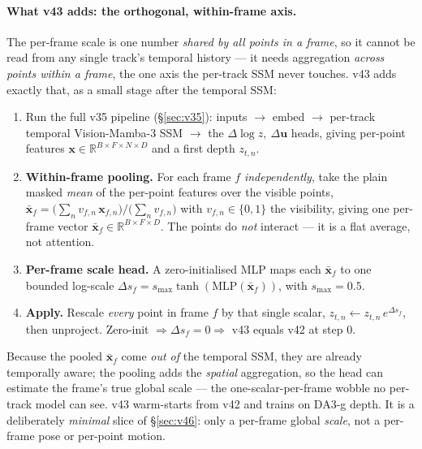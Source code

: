 \documentclass[11pt,a4paper]{article}
\begin{document}
\paragraph{What v43 adds: the orthogonal, within-frame axis.}
The per-frame scale is one number \emph{shared by all points in a frame}, so it cannot be read from any single
track's temporal history --- it needs aggregation \emph{across points within a frame}, the one axis the
per-track SSM never touches. v43 adds exactly that, as a small stage after the temporal SSM:
\begin{enumerate}
  \item Run the full v35 pipeline (\S\ref{sec:v35}): inputs $\to$ embed $\to$ per-track temporal Vision-Mamba-3 SSM
  $\to$ the $\Delta\log z,\ \Delta\mathbf{u}$ heads, giving per-point features
  $\mathbf{x}\in\mathbb{R}^{B\times F\times N\times D}$ and a first depth $z_{t,n}$.
  \item \textbf{Within-frame pooling.} For each frame $f$ \emph{independently}, take the plain masked
  \emph{mean} of the per-point features over the visible points,
  $\bar{\mathbf{x}}_f=\big(\sum_n v_{f,n}\,\mathbf{x}_{f,n}\big)\big/\big(\sum_n v_{f,n}\big)$ with
  $v_{f,n}\in\{0,1\}$ the visibility, giving one per-frame vector
  $\bar{\mathbf{x}}_f\in\mathbb{R}^{B\times F\times D}$. The points do \emph{not} interact --- it is a flat
  average, not attention.
  \item \textbf{Per-frame scale head.} A zero-initialised MLP maps each $\bar{\mathbf{x}}_f$ to one bounded
  log-scale $\Delta s_f=s_{\max}\tanh(\mathrm{MLP}(\bar{\mathbf{x}}_f))$, with $s_{\max}{=}0.5$.
  \item \textbf{Apply.} Rescale \emph{every} point in frame $f$ by that single scalar,
  $z_{t,n}\leftarrow z_{t,n}\,e^{\Delta s_f}$, then unproject. Zero-init $\Rightarrow\Delta s_f{=}0
  \Rightarrow$ v43 equals v42 at step 0.
\end{enumerate}
Because the pooled $\bar{\mathbf{x}}_f$ come \emph{out of} the temporal SSM, they are already temporally
aware; the pooling adds the \emph{spatial} aggregation, so the head can estimate the frame's true global
scale --- the one-scalar-per-frame wobble no per-track model can see. v43 warm-starts from v42 and trains on
DA3-g depth. It is a deliberately \emph{minimal} slice of \S\ref{sec:v46}: only a per-frame global
\emph{scale}, not a per-frame pose or per-point motion.
\end{document}
